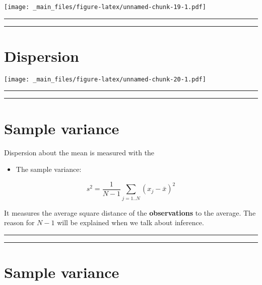\documentclass[
]{book}
\providecommand{\tightlist}{%
  \setlength{\itemsep}{0pt}\setlength{\parskip}{0pt}}
\begin{document}
\texttt{[image: \_main\_files/figure-latex/unnamed-chunk-19-1.pdf]}

\begin{center}\rule{0.5\linewidth}{0.5pt}\end{center}

\begin{center}\rule{0.5\linewidth}{0.5pt}\end{center}

\hypertarget{dispersion-1}{%
\section{Dispersion}\label{dispersion-1}}

\texttt{[image: \_main\_files/figure-latex/unnamed-chunk-20-1.pdf]}

\begin{center}\rule{0.5\linewidth}{0.5pt}\end{center}

\begin{center}\rule{0.5\linewidth}{0.5pt}\end{center}

\hypertarget{sample-variance}{%
\section{Sample variance}\label{sample-variance}}

Dispersion about the mean is measured with the

\begin{itemize}
\tightlist
\item
  The sample variance:
\end{itemize}

\[s^2=\frac{1}{N-1} \sum_{j=1..N} (x_j-\bar{x})^2\]

It measures the average square distance of the \textbf{observations} to the average. The reason for \(N-1\) will be explained when we talk about inference.

\begin{center}\rule{0.5\linewidth}{0.5pt}\end{center}

\begin{center}\rule{0.5\linewidth}{0.5pt}\end{center}

\hypertarget{sample-variance-1}{%
\section{Sample variance}\label{sample-variance-1}}
\end{document}
